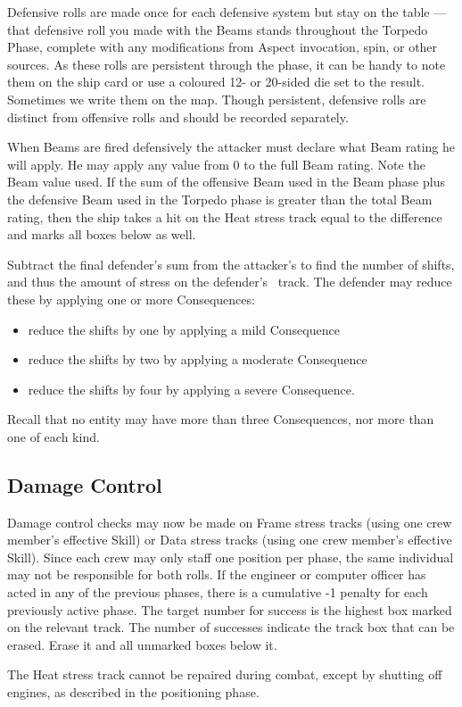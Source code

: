 Defensive rolls are made once for each defensive system but stay on the table --- that  defensive roll you made with the Beams stands throughout the Torpedo Phase, complete with any modifications from Aspect invocation, spin, or other sources. As these rolls are persistent through the phase, it can be handy to note them on the ship card or use a coloured 12- or 20-sided die set to the result. Sometimes we write them on the map. Though persistent, defensive rolls are distinct from offensive rolls and should be recorded separately.


When Beams are fired defensively the attacker must declare what Beam rating he will apply. He may apply any value from 0 to the full Beam rating. Note the Beam value used. If the sum of the offensive Beam used in the Beam phase plus the defensive Beam used in the Torpedo phase is greater than the total Beam rating, then the ship takes a hit on the Heat stress track equal to the difference and marks all boxes below as well.

Subtract the final defender's sum from the attacker's to find the number of shifts, and thus the amount of stress on the defender's \Frame\ track. The defender may reduce these by applying one or more Consequences:
\begin{itemize}
\item reduce the shifts by one by applying a mild Consequence
\item reduce the shifts by two by applying a moderate Consequence
\item reduce the shifts by four by applying a severe Consequence.
\end{itemize}

Recall that no entity may have more than three Consequences, nor more than one of each kind.


\subsection{Damage Control}
\label{sec:Damage Control}

Damage control checks may now be made on Frame stress tracks (using one crew member's effective  Skill) or Data stress tracks (using one crew member's effective  Skill). Since each crew may only staff one position per phase, the same individual may not be responsible for both rolls. If the engineer or computer officer has acted in any of the previous phases, there is a cumulative -1 penalty for each previously active phase. The target number for success is the highest box marked on the relevant track. The number of successes indicate the track box that can be erased. Erase it and all unmarked boxes below it.

The Heat stress track cannot be repaired during combat, except by shutting off engines, as described in the positioning phase.

